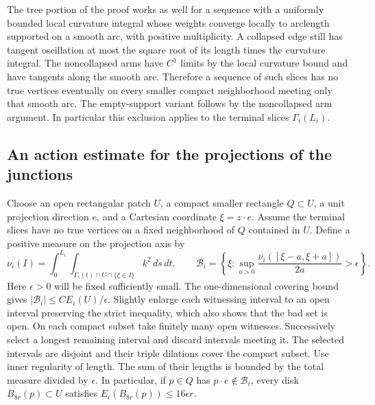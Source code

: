 The tree portion of the proof works as well for a sequence with a uniformly bounded local curvature integral whose weights converge locally to arclength supported on a smooth arc, with positive multiplicity. A collapsed edge still has tangent oscillation at most the square root of its length times the curvature integral. The noncollapsed arms have \(C^1\) limits by the local curvature bound and have tangents along the smooth arc. Therefore a sequence of such slices has no true vertices eventually on every smaller compact neighborhood meeting only that smooth arc. The empty-support variant follows by the noncollapsed arm argument. In particular this exclusion applies to the terminal slices \(\Gamma_i(L_i)\).

\subsection{An action estimate for the projections of the junctions}\label{sec:sweep}

Choose an open rectangular patch \(U\), a compact smaller rectangle \(Q\subset U\), a unit projection direction \(e\), and a Cartesian coordinate \(\xi=z\cdot e\). Assume the terminal slices have no true vertices on a fixed neighborhood of \(Q\) contained in \(U\). Define a positive measure on the projection axis by \[
\nu_i(I)=\int_0^{L_i}\int_{\Gamma_i(t)\cap U\cap\{\xi\in I\}} k^2\,ds\,dt,
\qquad
\mathcal B_i=\left\{\xi:\sup_{a>0}\frac{\nu_i([\xi-a,\xi+a])}{2a}>\epsilon\right\}.
\] Here \(\epsilon>0\) will be fixed sufficiently small. The one-dimensional covering bound gives \(|\mathcal B_i|\le C E_i(U)/\epsilon\). Slightly enlarge each witnessing interval to an open interval preserving the strict inequality, which also shows that the bad set is open. On each compact subset take finitely many open witnesses. Successively select a longest remaining interval and discard intervals meeting it. The selected intervals are disjoint and their triple dilations cover the compact subset. Use inner regularity of length. The sum of their lengths is bounded by the total measure divided by \(\epsilon\). In particular, if \(p\in Q\) has \(p\cdot e\notin\mathcal B_i\), every disk \(B_{8r}(p)\subset U\) satisfies \(E_i(B_{8r}(p))\le16\epsilon r\).

